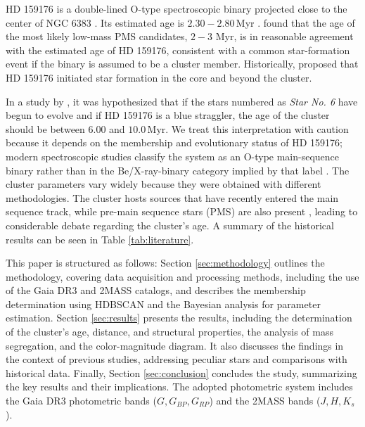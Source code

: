 \documentclass{aa}
\begin{document}
HD 159176 is a double-lined O-type spectroscopic binary projected close to the center of NGC 6383 \citep{1993Obs...113..204S,2007A&A...474..193L,2016ApJ...832..211P}. Its estimated age is $2.30-2.80$\,\textrm{Myr} \citep{2010AA...511A..25R}. \citet{2010AA...511A..25R} found that the age of the most likely low-mass PMS candidates, $2-3$ Myr, is in reasonable agreement with the estimated age of HD 159176, consistent with a common star-formation event if the binary is assumed to be a cluster member. Historically, \citet{1978MNRAS.182..607F} proposed that HD 159176 initiated star formation in the core and beyond the cluster.

In a study by \citet{2018AA...610A..30A}, it was hypothesized that if the stars numbered as \textit{Star No. 6} have begun to evolve and if HD 159176 is a blue straggler, the age of the cluster should be between $6.00$ and $10.0\,\textrm{Myr}$. We treat this interpretation with caution because it depends on the membership and evolutionary status of HD 159176; modern spectroscopic studies classify the system as an O-type main-sequence binary rather than in the Be/X-ray-binary category implied by that label \citep{1993Obs...113..204S,2007A&A...474..193L,2016ApJ...832..211P}. The cluster parameters vary widely because they were obtained with different methodologies. The cluster hosts sources that have recently entered the main sequence track, while pre-main sequence stars (PMS) are also present \citep{2019MNRAS.484.5102K}, leading to considerable debate regarding the cluster's age. A summary of the historical results can be seen in Table \ref{tab:literature}.

This paper is structured as follows: Section \ref{sec:methodology} outlines the methodology, covering data acquisition and processing methods, including the use of the Gaia DR3 and 2MASS catalogs, and describes the membership determination using HDBSCAN and the Bayesian analysis for parameter estimation. Section \ref{sec:results} presents the results, including the determination of the cluster's age, distance, and structural properties, the analysis of mass segregation, and the color-magnitude diagram. It also discusses the findings in the context of previous studies, addressing peculiar stars and comparisons with historical data. Finally, Section \ref{sec:conclusion} concludes the study, summarizing the key results and their implications. The adopted photometric system includes the Gaia DR3 photometric bands ($G, G_{BP}, G_{RP}$) and the 2MASS bands ($J, H, K_s$).
\end{document}
